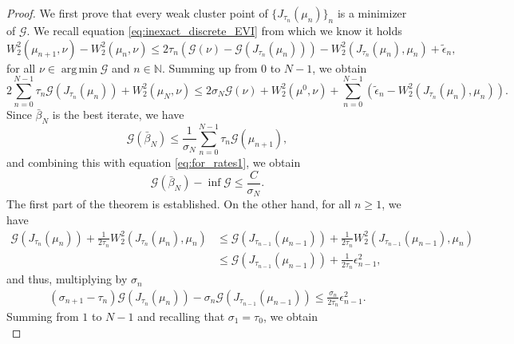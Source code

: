 \documentclass[11pt]{article}
\DeclareMathOperator*{\argmin}{arg\,min}
\newcommand{\cG}{\mathcal{G}}
\newcommand{\N}{\mathbb{N}}
\numberwithin{equation}{section}
\begin{document}
\begin{proof}
	We first prove that every weak cluster point of $\{J_{\tau_n}(\mu_n)\}_n$ is a minimizer of $\cG$. We recall equation \eqref{eq:inexact_discrete_EVI} from which we know it holds
	\begin{equation}\label{eq:inexact_discrete_EVI_2}
		W_2^2(\mu_{n+1},\nu) -  W_2^2(\mu_n,\nu) \leq 2\tau_n(\cG(\nu) -  \cG(J_{\tau_n}(\mu_n))) -  W_2^2(J_{\tau_n}(\mu_n),\mu_n) +\tilde{\epsilon}_n,
	\end{equation}
	for all $\nu \in \argmin \cG$ and $n \in \N$. Summing up from $0$ to $N-1$, we obtain
	\begin{equation}\label{eq:for_rates1}
		2\sum_{n=0}^{N-1}\tau_n\cG(J_{\tau_n}(\mu_n))+W_2^2(\mu_N,\nu)\leq 2\sigma_N \cG(\nu)+W_2^2(\mu^0,\nu)+\sum_{n=0}^{N-1}(\tilde{\epsilon}_n-W_2^2(J_{\tau_n}(\mu_n),\mu_n)).
	\end{equation}
	Since $\bar \beta_N$ is the best iterate, we have
	\begin{equation}\label{eq:bar_convexity}
		\cG(\bar \beta_N)\leq \frac{1}{\sigma_N}\sum_{n=0}^{N-1}\tau_n\cG(\mu_{n+1}),
	\end{equation}
	and combining this with equation \eqref{eq:for_rates1}, we obtain
	\begin{equation}\label{eq:rate_ergodic1}
		\cG(\bar \beta_N) - \inf \cG \leq \frac{C}{\sigma_N}.
	\end{equation}
	The first part of the theorem is established. On the other hand, for all $n\geq 1$, we have
	\begin{equation}\label{eq:decrease_JKO}
		\begin{aligned}
			\cG(J_{\tau_n}(\mu_{n}))+\frac{1}{2\tau_n}W_2^2(J_{\tau_n}(\mu_{n}),\mu_{n}) & \leq \cG(J_{\tau_{n-1}}(\mu_{n-1}))+\frac{1}{2\tau_n}W_2^2(J_{\tau_{n-1}}(\mu_{n-1}),\mu_{n})\\ &\leq \cG(J_{\tau_{n-1}}(\mu_{n-1}))+\frac{1}{2\tau_n}\epsilon_{n-1}^2,
		\end{aligned}
	\end{equation}
	and thus, multiplying by $\sigma_n$
	\begin{equation}
		\begin{aligned}
			(\sigma_{n+1}-\tau_n)\cG(J_{\tau_n}(\mu_{n})) - \sigma_{n}\cG(J_{\tau_{n-1}}(\mu_{n-1})) \leq \frac{\sigma_n}{2\tau_n}\epsilon_{n-1}^2.
		\end{aligned}
	\end{equation}
	Summing from $1$ to $N-1$ and recalling that $\sigma_1=\tau_0$, we obtain
	\begin{equation}\label{eq:inexact_decreasing_sum}

\end{equation}
\end{proof}
\end{document}
